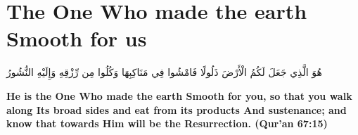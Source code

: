 \chapter{The One Who made the earth Smooth for us}
\begin{center}
    {\Huge    
        \begin{Arabic}
            هُوَ الَّذِي جَعَلَ لَكُمُ الْأَرْضَ ذَلُولًا فَامْشُوا فِي مَنَاكِبِهَا وَكُلُوا مِن رِّزْقِهِ وَإِلَيْهِ النُّشُورُ
        \end{Arabic}
    }
\end{center}
\vspace*{\fill}
\vspace{3cm}
\begin{center}
    \large \textbf{He is the One Who made the earth Smooth for you, so that you walk along Its broad sides and eat from its products And sustenance; and know that towards Him will be the Resurrection. (Qur'an 67:15)}
\end{center}
